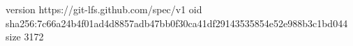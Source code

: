 version https://git-lfs.github.com/spec/v1
oid sha256:7c66a24b4f01ad4d8857adb47bb0f30ca41df29143535854e52e988b3c1bd044
size 3172
